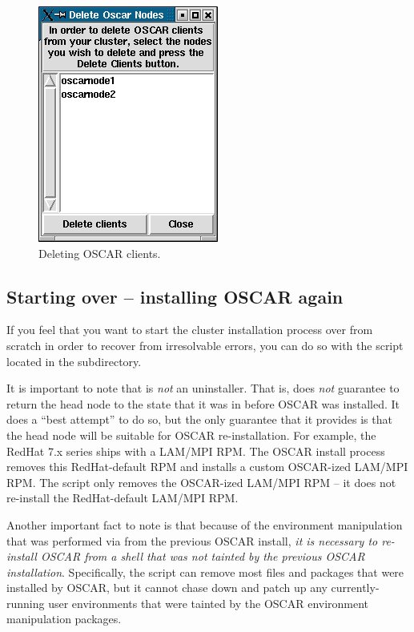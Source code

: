 \begin{figure}[htbp]
  \begin{center}
    \includegraphics[scale=\imgscale]{figs/10a_sbs-del-node}
    \caption{Deleting OSCAR clients.}
    \label{fig:detailed-delete-node}
  \end{center}
\end{figure}


\subsection{Starting over -- installing OSCAR again}

If you feel that you want to start the cluster installation process
over from scratch in order to recover from irresolvable errors, you
can do so with the  script located in the
 subdirectory.

It is important to note that  is {\em not} an
uninstaller.  That is,  does {\em not} guarantee to
return the head node to the state that it was in before OSCAR was
installed.  It does a ``best attempt'' to do so, but the only
guarantee that it provides is that the head node will be suitable for
OSCAR re-installation.  For example, the RedHat 7.x series ships with
a LAM/MPI RPM.  The OSCAR install process removes this RedHat-default
RPM and installs a custom OSCAR-ized LAM/MPI RPM.  The
 script only removes the OSCAR-ized LAM/MPI RPM -- it
does not re-install the RedHat-default LAM/MPI RPM.

Another important fact to note is that because of the environment
manipulation that was performed via  from the previous
OSCAR install, {\em it is necessary to re-install OSCAR from a shell
  that was not tainted by the previous OSCAR installation}.
Specifically, the  script can remove most files and
packages that were installed by OSCAR, but it cannot chase down and
patch up any currently-running user environments that were tainted by
the OSCAR environment manipulation packages.

